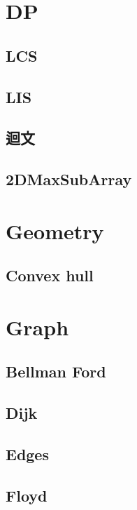 \section{DP}
    \subsection{LCS}
        
    \subsection{LIS}
        
    \subsection{迴文}
        
    \subsection{2DMaxSubArray}
        

\section{Geometry}
    \subsection{Convex hull}
        

\section{Graph}
    \subsection{Bellman Ford}
        
    \subsection{Dijk}
        
    \subsection{Edges}
            
    \subsection{Floyd}
        
